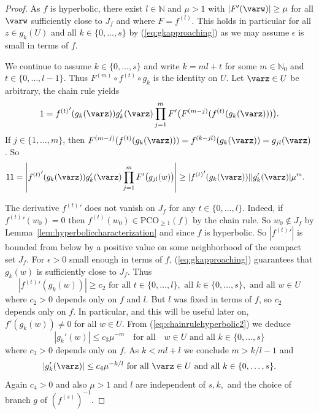 \documentclass[12pt,oneside,a4]{amsart}
\newcommand{\IN}{\mathbb{N}}
\numberwithin{maincounter}{section}
\numberwithin{equation}{section}
\newcommand{\pco}{\mathrm{PCO}}
\begin{document}
\begin{proof}
  As $f$ is hyperbolic, there exist $l\in\IN$ and $\mu > 1$ with
  $|F'(\varw)|\ge \mu$ for all $\varw$ sufficiently close to $J_f$ and where
  $F = f^{(l)}$. 
  This holds in particular for all  $z\in g_k(U)$ and all $k\in
  \{0,\ldots,s\}$ by
  (\ref{eq:gkapproaching}) as we may assume $\epsilon$ is small in
  terms of $f$.

  We continue to assume $k\in\{0,\ldots,s\}$ and 
  write $k=ml+t$ for some $m\in\IN_0$
  and $t\in \{0,\ldots,l-1\}$. Thus
  $F^{(m)}\circ f^{(t)}\circ g_k$  is the identity on $U$.
  Let $\varz\in U$ be arbitrary, the chain rule yields
  \begin{equation}
    \label{eq:chainrulehyperbolic}
    1 =    {f^{(t)}}'(g_k(\varz)) g'_k(\varz)\prod_{j=1}^m
      F'\bigl(F^{(m-j)}(f^{(t)}(g_k(\varz)))\bigr).
  \end{equation}
  If $j\in \{1,\ldots,m\}$, then
  $F^{(m-j)}(f^{(t)}(g_k(\varz))) = f^{(k-jl)}(g_{k}(\varz)) =
  g_{jl}(\varz)$. So 
  \begin{alignat}1
    \label{eq:chainrulehyperbolic2}
    1 &=
    \left|      {f^{(t)}}'(g_k(\varz)) g'_k(\varz)\prod_{j=1}^m F'\bigl(g_{jl}(w)\bigr)
\right|
    \ge    |      {f^{(t)}}'(g_k(\varz))| |g_k'(\varz)|\mu^m.
  \end{alignat}

  The derivative ${f^{(t)}}'$ does not vanish on $J_f$ for any $t\in
  \{0,\ldots,l\}$.
  Indeed, if
  ${f^{(t)}}'(w_0)=0$ then $f^{(t)}(w_0) \in \pco_{\ge 1}(f)$ by the
  chain rule.
  So $w_0\not\in J_f$ by Lemma~\ref{lem:hyperboliccharacterization}
  and since $f$ is hyperbolic. 
  So $|{f^{(t)}}'|$ is bounded from below
  by a positive value on some neighborhood of the compact set $J_f$. For
  $\epsilon>0$ small enough in terms of $f$, (\ref{eq:gkapproaching}) guarantees
  that $g_k(w)$ is sufficiently close to $J_f$. Thus
  \begin{equation*}
    |{f^{(t)}}'(g_k(w))|\ge c_2
    \text{ for all } t\in
    \{0,\ldots,l\},\text{ all }k\in\{0,\ldots,s\},\text{ and all }w\in U
  \end{equation*}
  where $c_2>0$ depends only on $f$ and $l$. But $l$ was fixed in
  terms of $f$, so $c_2$ depends only on $f$. 
  In particular, and this will be useful later on, $f'(g_k(w))\not=0$ for all $w\in U$.
  From (\ref{eq:chainrulehyperbolic2}) 
  we deduce
  \begin{equation*}
    |g_k'(w)|\le c_3 \mu^{-m}\quad\text{for all}\quad w\in U
    \text{ and all } k\in \{0,\ldots,s\}
  \end{equation*}
  where $c_3>0$ depends only on $f$. 
  As $k< ml+l$ we conclude $m> k/l-1$ and
  \begin{equation}
    \label{eq:gkprime}
    |g_k'(\varz)|\le c_4  \mu^{-k/l}\text{ for all } \varz\in U
    \text{ and all } k\in \{0,\ldots,s\}.
  \end{equation}
  Again $c_4>0$ and also $\mu>1$ and $l$ 
  are independent of $s,k,$ and the
  choice of branch $g$ of $(f^{(s)})^{-1}$.
  

\end{proof}
\end{document}

